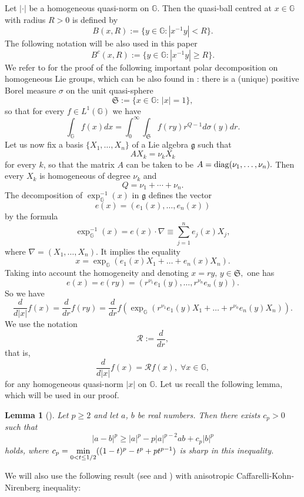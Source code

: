 \documentclass[a4paper,12pt,reqno]{amsart}
\numberwithin{equation}{section}
\theoremstyle{plain}
\newtheorem{lem}[thm]{Lemma}
\theoremstyle{definition}
\renewcommand{\wp}{\mathfrak S}
\begin{document}
Let $|\cdot|$ be a homogeneous quasi-norm on $\mathbb G$.
Then the quasi-ball centred at $x\in\mathbb{G}$ with radius $R > 0$ is defined by
$$B(x,R):=\{y\in \mathbb{G}: |x^{-1}y|<R\}.$$
The following notation will be also used in this paper
$$B^{c}(x,R):=\{y\in \mathbb{G}: |x^{-1}y|\geq R\}.$$
We refer to \cite{FS-Hardy} for the proof of the following important polar decomposition on homogeneous Lie groups, which can be also found in \cite[Section 3.1.7]{FR}:
there is a (unique)
positive Borel measure $\sigma$ on the
unit quasi-sphere
\begin{equation}\label{EQ:sphere}
\wp:=\{x\in \mathbb{G}:\,|x|=1\},
\end{equation}
so that for every $f\in L^{1}(\mathbb{G})$ we have
\begin{equation}\label{EQ:polar}
\int_{\mathbb{G}}f(x)dx=\int_{0}^{\infty}
\int_{\wp}f(ry)r^{Q-1}d\sigma(y)dr.
\end{equation}
Let us now fix a basis $\{X_{1},\ldots,X_{n}\}$ of a Lie algebra $\mathfrak{g}$
such that
$$AX_{k}=\nu_{k}X_{k}$$
for every $k$, so that the matrix $A$ can be taken to be
$A={\rm diag} (\nu_{1},\ldots,\nu_{n}).$
Then every $X_{k}$ is homogeneous of degree $\nu_{k}$ and
$$
Q=\nu_{1}+\cdots+\nu_{n}.
$$
The decomposition of ${\exp}_{\mathbb{G}}^{-1}(x)$ in $\mathfrak g$ defines the vector
$$e(x)=(e_{1}(x),\ldots,e_{n}(x))$$
by the formula
$${\exp}_{\mathbb{G}}^{-1}(x)=e(x)\cdot \nabla\equiv\sum_{j=1}^{n}e_{j}(x)X_{j},$$
where $\nabla=(X_{1},\ldots,X_{n})$.
It implies the equality
$$x={\exp}_{\mathbb{G}}\left(e_{1}(x)X_{1}+\ldots+e_{n}(x)X_{n}\right).$$
Taking into account the homogeneity and denoting $x=ry,\,y\in \wp,$ one has
$$
e(x)=e(ry)=(r^{\nu_{1}}e_{1}(y),\ldots,r^{\nu_{n}}e_{n}(y)).
$$
So we have
\begin{equation*}
\frac{d}{d|x|}f(x)=\frac{d}{dr}f(ry)=
 \frac{d}{dr}f({\exp}_{\mathbb{G}}
\left(r^{\nu_{1}}e_{1}(y)X_{1}+\ldots
+r^{\nu_{n}}e_{n}(y)X_{n}\right)).
\end{equation*}
We use the notation
\begin{equation}\label{EQ:Euler}
\mathcal{R} :=\frac{d}{dr},
\end{equation}
that is,
\begin{equation}\label{dfdr}
	\frac{d}{d|x|}f(x)=\mathcal{R}f(x), \;\forall x\in \mathbb G,
\end{equation}
for any homogeneous quasi-norm $|x|$ on $\mathbb G$.
Let us recall the following lemma, which will be used in our proof.
\begin{lem}[\cite{FrS08}]
\label{FrS}
Let $p\geq2$ and let $a$, $b$ be real numbers. Then there exists $c_{p}>0$ such that
$$|a-b|^{p}\geq|a|^{p}-p|a|^{p-2}ab+c_{p}|b|^{p}$$
holds, where $c_{p}=\underset{0<t\leq1/2}{\rm min}((1-t)^{p}-t^{p}+pt^{p-1})$ is sharp in this inequality.
\end{lem}
We will also use the following result (see \cite{ORS16} and \cite{Ruzhansky-Suragan:L2-CKN}) with anisotropic Caffarelli-Kohn-Nirenberg inequality:
\end{document}
